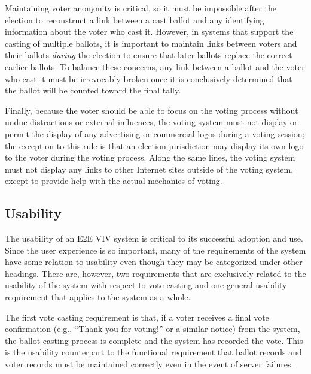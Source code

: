 Maintaining voter anonymity is critical, so it must be impossible
after the election to reconstruct a link between a cast ballot and any
identifying information about the voter who cast it. However, in
systems that support the casting of multiple ballots, it is important
to maintain links between voters and their ballots \emph{during} the
election to ensure that later ballots replace the correct earlier
ballots. To balance these concerns, any link between a ballot and the
voter who cast it must be irrevocably broken once it is conclusively
determined that the ballot will be counted toward the final tally.

Finally, because the voter should be able to focus on the voting
process without undue distractions or external influences, the voting
system must not display or permit the display of any advertising or
commercial logos during a voting session; the exception to this rule
is that an election jurisdiction may display its own logo to the voter
during the voting process. Along the same lines, the voting system
must not display any links to other Internet sites outside of the
voting system, except to provide help with the actual mechanics of
voting.

\subsection{Usability}

The usability of an E2E VIV system is critical to its successful
adoption and use. Since the user experience is so important, many of
the requirements of the system have some relation to usability even
though they may be categorized under other headings. There are,
however, two requirements that are exclusively related to the
usability of the system with respect to vote casting and one general
usability requirement that applies to the system as a whole.

The first vote casting requirement is that, if a voter receives a
final vote confirmation (e.g., ``Thank you for voting!'' or a similar
notice) from the system, the ballot casting process is complete and the system has recorded the vote.   
This is the usability counterpart to the
functional requirement that ballot records and voter records must be
maintained correctly even in the event of server failures.

